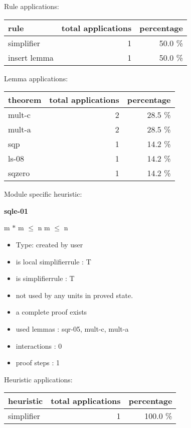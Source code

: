 \documentclass[a4paper]{article}
\begin{document}
Rule applications:

\begin{supertabular}{l|r|r}
rule	        & total applications & percentage \\ \hline
simplifier & 1 & 50.0 \% \\
insert lemma & 1 & 50.0 \% \\

\end{supertabular}

Lemma applications:

\begin{supertabular}{l|r|r}
theorem	        & total applications & percentage \\ \hline
mult-c & 2 & 28.5 \% \\
mult-a & 2 & 28.5 \% \\
sqp & 1 & 14.2 \% \\
ls-08 & 1 & 14.2 \% \\
sqzero & 1 & 14.2 \% \\

\end{supertabular}

Module specific heuristic:

\pagebreak

{\LARGE\bf sqle-01}\label{lemma-sqle-01}

\medskip

 \Fol m $*$ m $\le$ n \Imp m $\le$ n

\begin{itemize}

\item Type: created by user

\item is local simplifierrule : T
\item is simplifierrule : T
\item not used by any units in proved state.
\item       a complete proof exists
\item       used lemmas  : sqr-05, mult-c, mult-a
\item       interactions : 0
\item       proof steps  : 1
\end{itemize}

\medskip


Heuristic applications:

\begin{supertabular}{l|r|r}
heuristic	& total applications & percentage \\ \hline
simplifier & 1 & 100.0 \% \\

\end{supertabular}
\end{document}
